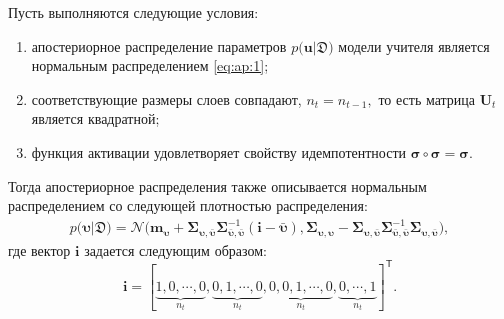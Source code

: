 \begin{theorem}
\label{theorem:ap:layer}
Пусть выполняются следующие условия:
\begin{enumerate}
\item апостериорное распределение параметров $p\bigr(\mathbf{u}|\mathfrak{D}\bigr)$ модели учителя является нормальным распределением \eqref{eq:ap:1};
\item соответствующие размеры слоев совпадают, $n_t=n_{t-1},$ то есть матрица $\mathbf{U}_t$ является квадратной;
\item функция активации удовлетворяет свойству идемпотентности $\bm{\sigma} \circ \bm{\sigma} = \bm{\sigma}$.
\end{enumerate}
Тогда апостериорное распределения также описывается нормальным распределением со следующей плотностью распределения:
\[
\label{eq:ap:5}
\begin{aligned}
p\bigr(\bm{\upsilon}|\mathfrak{D}\bigr) = \mathcal{N}\bigr(\mathbf{m}_{\bm{\upsilon}}+\bm{\Sigma}_{\bm{\upsilon},\bar{\bm{\upsilon}}} \bm{\Sigma}_{\bar{\bm{\upsilon}},\bar{\bm{\upsilon}}}^{-1} \left(\mathbf{i} - \bar{\bm{\upsilon}}\right), \bm{\Sigma}_{\bm{\upsilon},\bm{\upsilon}} - \bm{\Sigma}_{\bm{\upsilon},\bar{\bm{\upsilon}}}\bm{\Sigma}_{\bar{\bm{\upsilon}},\bar{\bm{\upsilon}}}^{-1}\bm{\Sigma}_{\bm{\upsilon},\bar{\bm{\upsilon}}}\bigr),
\end{aligned}
\]
где вектор $\mathbf{i}$ задается следующим образом:
\[
\mathbf{i}=[\underbrace{1, 0, \cdots, 0}_{n_t}, \underbrace{0, 1, \cdots, 0}_{n_t}, \underbrace{0, 0, 1, \cdots, 0}_{n_t}, \underbrace{0, \cdots, 1}_{n_t}]^{\mathsf{T}}.
\]
\end{theorem}
